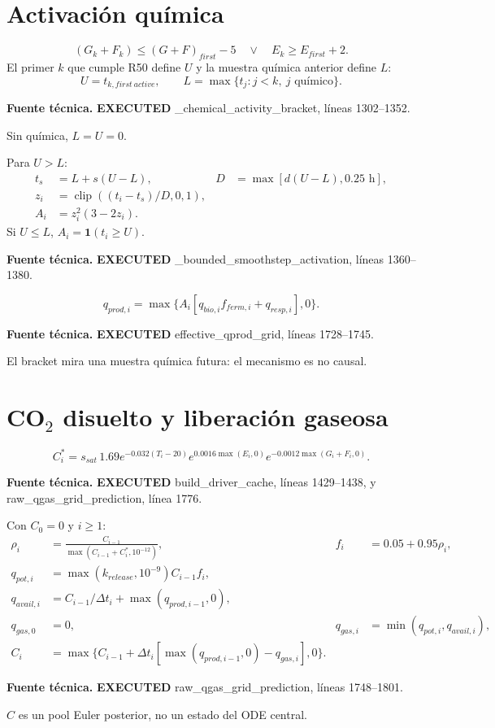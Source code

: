 \documentclass[11pt]{article}
\newcommand{\E}[1]{%
  \nobreak\hspace{0.16em}%
  \begingroup
  \setlength{\fboxsep}{1.5pt}%
  \colorbox{auditpale}{\textcolor{auditblue}{\sffamily\bfseries\scriptsize #1}}%
  \endgroup\hspace{0.16em}%
}
\newcommand{\code}[1]{{\small\ttfamily #1}}
\newcommand{\sourceinfo}[1]{%
  \par\vspace{-0.15em}%
  {\small\color{auditslate}\sffamily\textbf{Fuente técnica.}\enspace #1\par}%
  \vspace{0.25em}%
}
\DeclareMathOperator{\clip}{clip}
\begin{document}
\section{Activación química}

\begin{equation}
(G_k+F_k)\le(G+F)_{first}-5\quad\lor\quad E_k\ge E_{first}+2. \tag{R50}
\end{equation}
El primer $k$ que cumple R50 define $U$ y la muestra química anterior define
$L$:
\begin{equation}
U=t_{k,first\ active},\qquad L=\max\{t_j:j<k,\ j\text{ químico}\}. \tag{R51}
\end{equation}
\sourceinfo{\E{EXECUTED} \code{\_chemical\_activity\_bracket}, líneas 1302--1352.}
Sin química, $L=U=0$.

Para $U>L$:
\begin{align}
t_s&=L+s(U-L),&D&=\max[d(U-L),0.25\text{ h}], \tag{R52}\\
z_i&=\clip((t_i-t_s)/D,0,1), \tag{R53}\\
A_i&=z_i^2(3-2z_i). \tag{R54}
\end{align}
Si $U\le L$, $A_i=\mathbf 1(t_i\ge U)$.
\sourceinfo{\E{EXECUTED} \code{\_bounded\_smoothstep\_activation}, líneas 1360--1380.}

\begin{equation}
q_{prod,i}=\max\{A_i[q_{bio,i}f_{ferm,i}+q_{resp,i}],0\}. \tag{R55}
\end{equation}
\sourceinfo{\E{EXECUTED} \code{effective\_qprod\_grid}, líneas 1728--1745.}
El bracket mira una muestra química futura: el mecanismo es no causal.

\section{CO$_2$ disuelto y liberación gaseosa}

\begin{equation}
C_i^*=s_{sat}\,1.69e^{-0.032(T_i-20)}e^{0.0016\max(E_i,0)}
e^{-0.0012\max(G_i+F_i,0)}. \tag{R56}
\end{equation}
\sourceinfo{\E{EXECUTED} \code{build\_driver\_cache}, líneas 1429--1438, y
\code{raw\_qgas\_grid\_prediction}, línea 1776.}

Con $C_0=0$ y $i\ge1$:
\begin{align}
\rho_i&=\frac{C_{i-1}}{\max(C_{i-1}+C_i^*,10^{-12})},&
f_i&=0.05+0.95\rho_i, \tag{R57}\\
q_{pot,i}&=\max(k_{release},10^{-9})C_{i-1}f_i, \tag{R58}\\
q_{avail,i}&=C_{i-1}/\Delta t_i+\max(q_{prod,i-1},0), \tag{R59}\\
q_{gas,0}&=0,&q_{gas,i}&=\min(q_{pot,i},q_{avail,i}), \tag{R60}\\
C_i&=\max\{C_{i-1}+\Delta t_i[\max(q_{prod,i-1},0)-q_{gas,i}],0\}. \tag{R61}
\end{align}
\sourceinfo{\E{EXECUTED} \code{raw\_qgas\_grid\_prediction}, líneas 1748--1801.}
$C$ es un pool Euler posterior, no un estado del ODE central.
\end{document}
